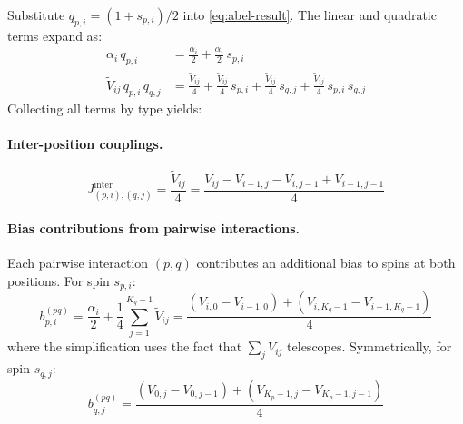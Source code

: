 \documentclass[11pt]{article}
\begin{document}
Substitute $q_{p,i} = (1+s_{p,i})/2$ into \cref{eq:abel-result}.
The linear and quadratic terms expand as:
\begin{align}
  \alpha_i\, q_{p,i} &= \tfrac{\alpha_i}{2} + \tfrac{\alpha_i}{2}\, s_{p,i} \\[2pt]
  \widetilde{V}_{ij}\, q_{p,i}\, q_{q,j}
    &= \tfrac{\widetilde{V}_{ij}}{4}
     + \tfrac{\widetilde{V}_{ij}}{4}\, s_{p,i}
     + \tfrac{\widetilde{V}_{ij}}{4}\, s_{q,j}
     + \tfrac{\widetilde{V}_{ij}}{4}\, s_{p,i}\, s_{q,j}
\end{align}
Collecting all terms by type yields:

\paragraph{Inter-position couplings.}
\begin{equation}\label{eq:Jinter}
\boxed{\;
  J^{\mathrm{inter}}_{(p,i),(q,j)} = \frac{\widetilde{V}_{ij}}{4}
  = \frac{V_{ij} - V_{i-1,j} - V_{i,j-1} + V_{i-1,j-1}}{4}
\;}
\end{equation}

\paragraph{Bias contributions from pairwise interactions.}
Each pairwise interaction $(p,q)$ contributes an additional bias to spins at both positions.
For spin $s_{p,i}$:
\begin{equation}\label{eq:bias-pairwise}
  b_{p,i}^{(pq)}
  = \frac{\alpha_i}{2} + \frac{1}{4}\sum_{j=1}^{K_q-1} \widetilde{V}_{ij}
  = \frac{(V_{i,0} - V_{i-1,0}) + (V_{i,K_q-1} - V_{i-1,K_q-1})}{4}
\end{equation}
where the simplification uses the fact that $\sum_j \widetilde{V}_{ij}$ telescopes.
Symmetrically, for spin $s_{q,j}$:
\begin{equation}\label{eq:bias-pairwise-q}
  b_{q,j}^{(pq)}
  = \frac{(V_{0,j} - V_{0,j-1}) + (V_{K_p-1,j} - V_{K_p-1,j-1})}{4}
\end{equation}
\end{document}
